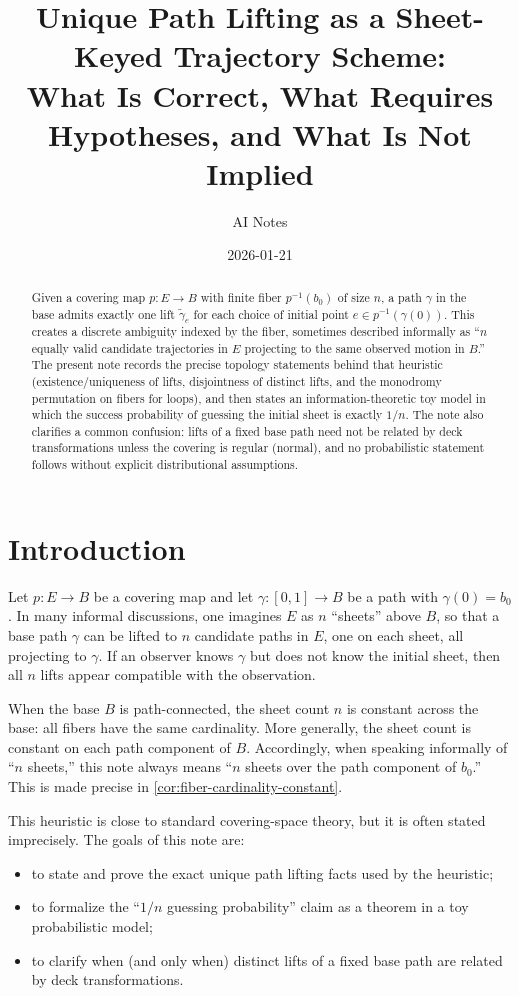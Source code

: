 \documentclass[11pt,a4paper]{article}
\title{Unique Path Lifting as a Sheet-Keyed Trajectory Scheme:\\
What Is Correct, What Requires Hypotheses, and What Is Not Implied}
\author{AI Notes}
\date{2026-01-21}
\theoremstyle{definition}
\theoremstyle{remark}
\begin{document}
\maketitle

\begin{abstract}
Given a covering map \(p:E\to B\) with finite fiber \(p^{-1}(b_0)\) of size \(n\), a path \(\gamma\) in the base admits exactly one lift \(\tilde\gamma_e\) for each choice of initial point \(e\in p^{-1}(\gamma(0))\). This creates a discrete ambiguity indexed by the fiber, sometimes described informally as ``\(n\) equally valid candidate trajectories in \(E\) projecting to the same observed motion in \(B\).'' The present note records the precise topology statements behind that heuristic (existence/uniqueness of lifts, disjointness of distinct lifts, and the monodromy permutation on fibers for loops), and then states an information-theoretic toy model in which the success probability of guessing the initial sheet is exactly \(1/n\). The note also clarifies a common confusion: lifts of a fixed base path need not be related by deck transformations unless the covering is regular (normal), and no probabilistic statement follows without explicit distributional assumptions.
\end{abstract}

\section{Introduction}
\label{sec:introduction}

Let \(p:E\to B\) be a covering map and let \(\gamma:[0,1]\to B\) be a path with \(\gamma(0)=b_0\). In many informal discussions, one imagines \(E\) as \(n\) ``sheets'' above \(B\), so that a base path \(\gamma\) can be lifted to \(n\) candidate paths in \(E\), one on each sheet, all projecting to \(\gamma\). If an observer knows \(\gamma\) but does not know the initial sheet, then all \(n\) lifts appear compatible with the observation.

When the base \(B\) is path-connected, the sheet count \(n\) is constant across the base: all fibers have the same cardinality. More generally, the sheet count is constant on each path component of \(B\). Accordingly, when speaking informally of ``\(n\) sheets,'' this note always means ``\(n\) sheets over the path component of \(b_0\).'' This is made precise in \cref{cor:fiber-cardinality-constant}.

This heuristic is close to standard covering-space theory, but it is often stated imprecisely. The goals of this note are:
\begin{itemize}
  \item to state and prove the exact unique path lifting facts used by the heuristic;
  \item to formalize the ``\(1/n\) guessing probability'' claim as a theorem in a toy probabilistic model;
  \item to clarify when (and only when) distinct lifts of a fixed base path are related by deck transformations.
\end{itemize}
\end{document}
